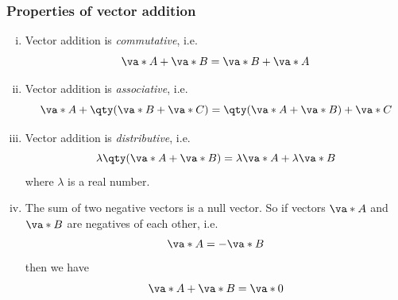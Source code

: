 		\subsubsection{Properties of vector addition}
			\begin{enumerate}[i.]
				\item Vector addition is \textit{commutative}, i.e.
				$$\va*{A}+\va*{B}=\va*{B}+\va*{A}$$
				
				\item Vector addition is \textit{associative}, i.e.
				$$\va*{A}+\qty(\va*{B}+\va*{C})=\qty(\va*{A}+\va*{B})+\va*{C}$$
				
				\item Vector addition is \textit{distributive}, i.e.
				$$\lambda\qty(\va*{A}+\va*{B})=\lambda\va*{A}+\lambda\va*{B}$$
				where $\lambda$ is a real number.
				
				\item The sum of two negative vectors is a null vector. So if vectors $\va*{A}$ and $\va*{B}$ are negatives of each other, i.e.
				$$\va*{A}=-\va*{B}$$
				then we have
				$$\va*{A}+\va*{B}=\va*{0}$$
			\end{enumerate}
			
